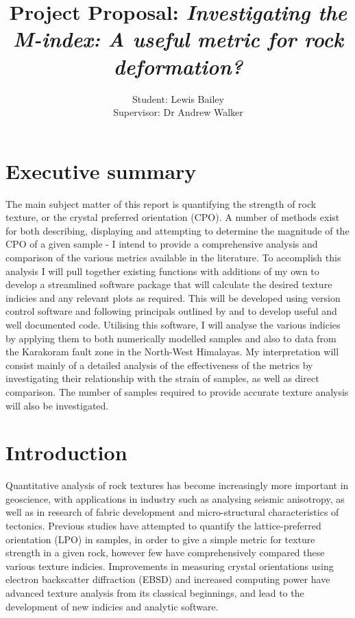 \documentclass[a4paper,11pt]{article}
\title{\textbf{Project Proposal: \textit{Investigating the M-index: A useful metric for rock deformation?}}}
\author{Student: Lewis Bailey\\Supervisor: Dr Andrew Walker}
\date{}
\numberwithin{equation}{section}
\begin{document}
\maketitle

\section{Executive summary}
The main subject matter of this report is quantifying  the strength of rock texture, or the crystal preferred orientation (CPO). A number of methods exist for both describing, displaying  and attempting to determine the magnitude of the CPO of a given sample \citep{Mainprice,Skemer,Woodcock} - I intend to provide a comprehensive analysis and comparison of the various metrics available in the literature. To accomplish this analysis I will pull together existing functions with additions of my own to develop a streamlined software package that will calculate the desired texture indicies and any relevant plots as required. This will be developed using version control software and following principals outlined by \cite{Computing} and \cite{Walker} to develop useful and well documented code. Utilising this software, I will analyse the various indicies by applying them to both numerically modelled samples and also to data from the Karakoram fault zone in the North-West Himalayas. My interpretation will consist mainly of a detailed analysis of the effectiveness of the metrics by investigating their relationship with the strain of samples, as well as direct comparison. The number of samples required to provide accurate texture analysis will also be investigated.  

\section{Introduction} \label{sec:intro}
Quantitative analysis of rock textures has become increasingly more important in geoscience, with applications in industry such as analysing seismic anisotropy, as well as in research of fabric development and micro-structural characteristics of tectonics. Previous studies have attempted to quantify the lattice-preferred orientation (LPO) in samples, in order to give a simple metric for texture strength in a given rock, however few have comprehensively compared these various texture indicies. Improvements in measuring crystal orientations using electron backscatter diffraction (EBSD) and increased computing power have advanced texture analysis from its classical beginnings, and lead to the development of new indicies and analytic software. 
\end{document}
